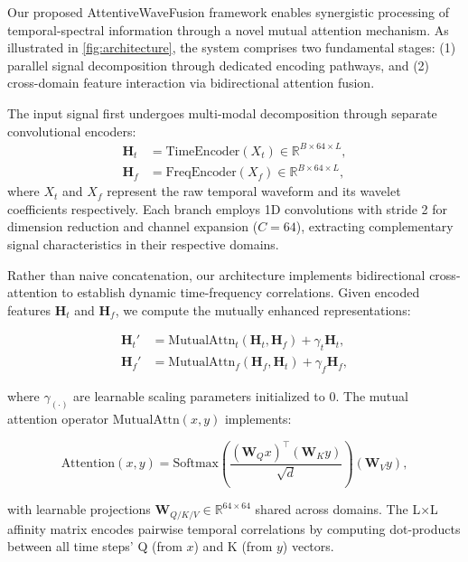 \documentclass[12pt]{article}
\begin{document}
Our proposed AttentiveWaveFusion framework enables synergistic processing of temporal-spectral information through a novel mutual attention mechanism. As illustrated in \autoref{fig:architecture}, the system comprises two fundamental stages: (1) parallel signal decomposition through dedicated encoding pathways, and (2) cross-domain feature interaction via bidirectional attention fusion.


The input signal first undergoes multi-modal decomposition through separate convolutional encoders:
\begin{equation}
    \begin{aligned}
        \mathbf{H}_t & = \text{TimeEncoder}(X_t) \in \mathbb{R}^{B \times 64 \times L}, \\
        \mathbf{H}_f & = \text{FreqEncoder}(X_f) \in \mathbb{R}^{B \times 64 \times L},
    \end{aligned}
\end{equation}
where $X_t$ and $X_f$ represent the raw temporal waveform and its wavelet coefficients respectively. Each branch employs 1D convolutions with stride 2 for dimension reduction and channel expansion ($C=64$), extracting complementary signal characteristics in their respective domains.


Rather than naive concatenation, our architecture implements bidirectional cross-attention to establish dynamic time-frequency correlations. Given encoded features $\mathbf{H}_t$ and $\mathbf{H}_f$, we compute the mutually enhanced representations:

\begin{equation}
    \begin{aligned}
        \mathbf{H}_t' & = \text{MutualAttn}_t(\mathbf{H}_t, \mathbf{H}_f) + \gamma_t \mathbf{H}_t, \\
        \mathbf{H}_f' & = \text{MutualAttn}_f(\mathbf{H}_f, \mathbf{H}_t) + \gamma_f \mathbf{H}_f,
    \end{aligned}
\end{equation}

where $\gamma_{(\cdot)}$ are learnable scaling parameters initialized to 0. The mutual attention operator $\text{MutualAttn}(x,y)$ implements:

\begin{equation}
    \text{Attention}(x,y) = \text{Softmax}\left(\frac{(\mathbf{W}_Q x)^\top (\mathbf{W}_K y)}{\sqrt{d}}\right)(\mathbf{W}_V y),
\end{equation}

\noindent with learnable projections $\mathbf{W}_{Q/K/V} \in \mathbb{R}^{64 \times 64}$ shared across domains. The L×L affinity matrix encodes pairwise temporal correlations by computing dot-products between all time steps' Q (from $x$) and K (from $y$) vectors.
\end{document}
